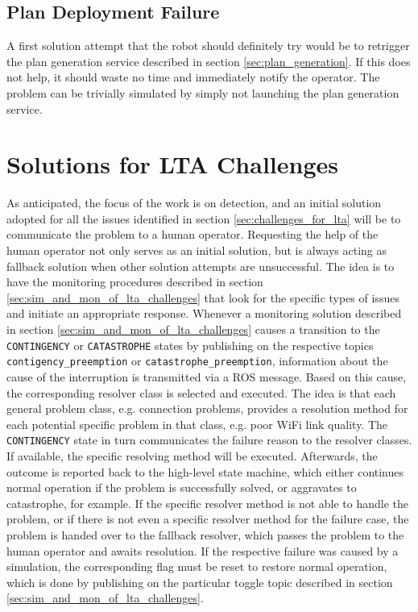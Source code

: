 \documentclass[english, master, utf8]{base/thesis_KBS}
\newcommand{\code}[1]{\colorbox{light-gray}{\texttt{#1}}}
\begin{document}
\subsection{Plan Deployment Failure}
\label{sec:sim_and_mon_plan_deployment_failures}

A first solution attempt that the robot should definitely try would be to retrigger the plan generation service described in section \ref{sec:plan_generation}. 
If this does not help, it should waste no time and immediately notify the operator.\newline
The problem can be trivially simulated by simply not launching the plan generation service.

\section{Solutions for LTA Challenges}
\label{sec:solutions_for_lta_challenges}

As anticipated, the focus of the work is on detection, and an initial solution adopted for all the issues identified in section \ref{sec:challenges_for_lta} will be 
to communicate the problem to a human operator. Requesting the help of the human operator not only serves as an initial solution, but is always acting as fallback 
solution when other solution attempts are unsuccessful. The idea is to have the monitoring procedures described in section \ref{sec:sim_and_mon_of_lta_challenges} that 
look for the specific types of issues and initiate an appropriate response.\newline
Whenever a monitoring solution described in section \ref{sec:sim_and_mon_of_lta_challenges} causes a transition to the \code{CONTINGENCY} or \code{CATASTROPHE} states
by publishing on the respective topics \code{contigency\_preemption} or \code{catastrophe\_preemption}, information about the cause of the interruption is
transmitted via a ROS message. Based on this cause, the corresponding resolver class is selected and executed. The idea is that each general problem class, e.g.
connection problems, provides a resolution method for each potential specific problem in that class, e.g. poor WiFi link quality. The \code{CONTINGENCY} state in turn
communicates the failure reason to the resolver classes. If available, the specific resolving method will be executed. Afterwards, the outcome is reported back to the
high-level state machine, which either continues normal operation if the problem is successfully solved, or aggravates to catastrophe, for example. If the specific resolver
method is not able to handle the problem, or if there is not even a specific resolver method for the failure case, the problem is handed over to the fallback resolver,
which passes the problem to the human operator and awaits resolution. If the respective failure was caused by a simulation, the corresponding flag must be reset to restore
normal operation, which is done by publishing on the particular toggle topic described in section \ref{sec:sim_and_mon_of_lta_challenges}.\newline
\end{document}
